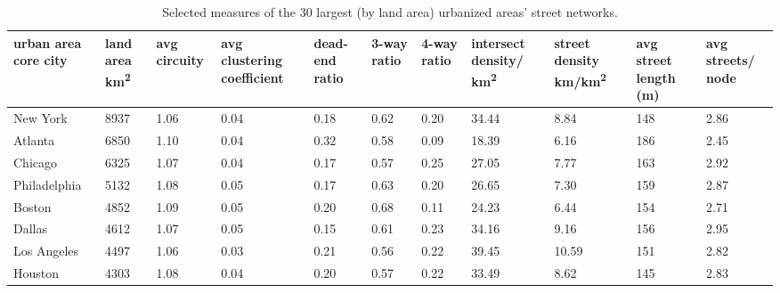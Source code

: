 \documentclass[11pt]{article}
\begin{document}
\begin{table}
\centering
\caption{Selected measures of the 30 largest (by land area) urbanized areas' street networks.}
\label{tab:largest_urbanized_areas}
\small
\begin{tabular}{p{2.5cm} p{1.5cm} p{1.5cm} p{1.5cm} p{1.55cm} p{1.5cm} p{1.5cm} p{1.5cm} p{1.5cm} p{1.5cm} p{1.5cm}}
	\hline
	urban area core city & land area km\textsuperscript{2} & avg circuity & avg clustering coefficient & dead-end ratio & 3-way ratio & 4-way ratio & intersect density/ km\textsuperscript{2} & street density km/km\textsuperscript{2} & avg street length (m) & avg streets/ node \\
	\hline
	New York             & 8937          & 1.06         & 0.04                       & 0.18           & 0.62        & 0.20        & 34.44                 & 8.84                  & 148                   & 2.86             \\
	Atlanta              & 6850          & 1.10         & 0.04                       & 0.32           & 0.58        & 0.09        & 18.39                 & 6.16                  & 186                   & 2.45             \\
	Chicago              & 6325          & 1.07         & 0.04                       & 0.17           & 0.57        & 0.25        & 27.05                 & 7.77                  & 163                   & 2.92             \\
	Philadelphia         & 5132          & 1.08         & 0.05                       & 0.17           & 0.63        & 0.20        & 26.65                 & 7.30                  & 159                   & 2.87             \\
	Boston               & 4852          & 1.09         & 0.05                       & 0.20           & 0.68        & 0.11        & 24.23                 & 6.44                  & 154                   & 2.71             \\
	Dallas               & 4612          & 1.07         & 0.05                       & 0.15           & 0.61        & 0.23        & 34.16                 & 9.16                  & 156                   & 2.95             \\
	Los Angeles          & 4497          & 1.06         & 0.03                       & 0.21           & 0.56        & 0.22        & 39.45                 & 10.59                 & 151                   & 2.82             \\
	Houston              & 4303          & 1.08         & 0.04                       & 0.20           & 0.57        & 0.22        & 33.49                 & 8.62                  & 145                   & 2.83             \\

\end{tabular}
\end{table}
\end{document}
